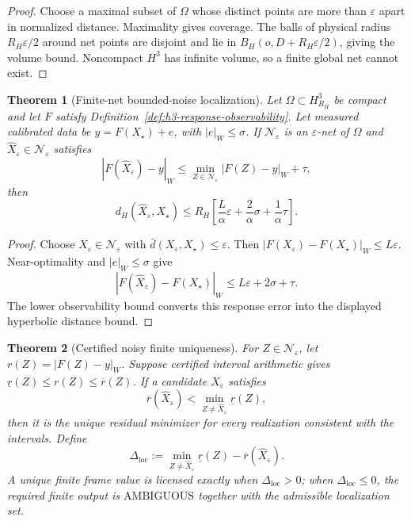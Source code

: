 \documentclass[11pt]{article}
\newtheorem{theorem}{Theorem}[section]
\begin{document}
\begin{proof}
Choose a maximal subset of \(\Omega\) whose distinct points are more than
\(\varepsilon\) apart in normalized distance. Maximality gives coverage. The
balls of physical radius \(R_H\varepsilon/2\) around net points are disjoint
and lie in \(B_H(o,D+R_H\varepsilon/2)\), giving the volume bound. Noncompact
\(H^3\) has infinite volume, so a finite global net cannot exist.
\end{proof}

\begin{theorem}[Finite-net bounded-noise localization]
\label{thm:h3-finite-net-localization}
Let \(\Omega\subset H^3_{R_H}\) be compact and let \(F\) satisfy
Definition~\ref{def:h3-response-observability}. Let measured calibrated data
be \(y=F(X_\star)+e\), with \(|e|_W\leq\sigma\). If
\(\mathcal N_\varepsilon\) is an \(\varepsilon\)-net of \(\Omega\) and
\(\widehat X_\varepsilon\in\mathcal N_\varepsilon\) satisfies
\[
|F(\widehat X_\varepsilon)-y|_W
\leq
\min_{Z\in\mathcal N_\varepsilon}|F(Z)-y|_W+\tau,
\]
then
\[
d_H(\widehat X_\varepsilon,X_\star)
\leq
R_H\left[
\frac L\alpha\varepsilon+\frac2\alpha\sigma+\frac1\alpha\tau
\right].
\]
\end{theorem}

\begin{proof}
Choose \(X_\varepsilon\in\mathcal N_\varepsilon\) with
\(\bar d(X_\varepsilon,X_\star)\leq\varepsilon\). Then
\(|F(X_\varepsilon)-F(X_\star)|_W\leq L\varepsilon\). Near-optimality and
\(|e|_W\leq\sigma\) give
\[
|F(\widehat X_\varepsilon)-F(X_\star)|_W\leq L\varepsilon+2\sigma+\tau.
\]
The lower observability bound converts this response error into the displayed
hyperbolic distance bound.
\end{proof}

\begin{theorem}[Certified noisy finite uniqueness]\label{thm:h3-certified-noisy-uniqueness}
For \(Z\in\mathcal N_\varepsilon\), let \(r(Z)=|F(Z)-y|_W\). Suppose certified
interval arithmetic gives \(\underline r(Z)\leq r(Z)\leq\overline r(Z)\). If a
candidate \(\widehat X_\varepsilon\) satisfies
\[
\overline r(\widehat X_\varepsilon)
<
\min_{Z\neq\widehat X_\varepsilon}\underline r(Z),
\]
then it is the unique residual minimizer for every realization consistent with
the intervals. Define
\[
\Delta_{\mathrm{loc}}
:=
\min_{Z\neq\widehat X_\varepsilon}\underline r(Z)
-\overline r(\widehat X_\varepsilon).
\]
A unique finite frame value is licensed exactly when \(\Delta_{\mathrm{loc}}>0\);
when \(\Delta_{\mathrm{loc}}\leq0\), the required finite output is
\(\mathrm{AMBIGUOUS}\) together with the admissible localization set.
\end{theorem}
\end{document}
